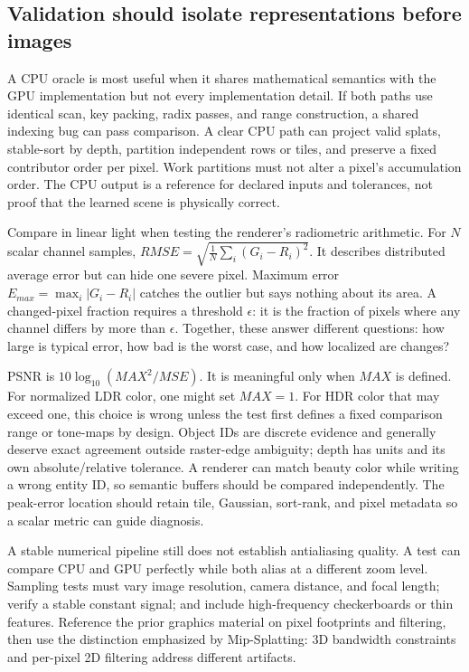 \subsection{Validation should isolate representations before images}\label{04-visual-computing-ii-ch037-validation-should-isolate-representations-before-images}

\hypertarget{04-visual-computing-ii-ch037-validation-should-isolate-representations-before-images}{}

A CPU oracle is most useful when it shares mathematical semantics with the GPU implementation but not every implementation detail. If both paths use identical scan, key packing, radix passes, and range construction, a shared indexing bug can pass comparison. A clear CPU path can project valid splats, stable-sort by depth, partition independent rows or tiles, and preserve a fixed contributor order per pixel. Work partitions must not alter a pixel's accumulation order. The CPU output is a reference for declared inputs and tolerances, not proof that the learned scene is physically correct.

Compare in linear light when testing the renderer's radiometric arithmetic. For \(N\) scalar channel samples, \(RMSE=\sqrt{\frac1N\sum_i(G_i-R_i)^2}\). It describes distributed average error but can hide one severe pixel. Maximum error \(E_{max}=\max_i|G_i-R_i|\) catches the outlier but says nothing about its area. A changed-pixel fraction requires a threshold \(\epsilon\): it is the fraction of pixels where any channel differs by more than \(\epsilon\). Together, these answer different questions: how large is typical error, how bad is the worst case, and how localized are changes?

PSNR is \(10\log_{10}(MAX^2/MSE)\). It is meaningful only when \(MAX\) is defined. For normalized LDR color, one might set \(MAX=1\). For HDR color that may exceed one, this choice is wrong unless the test first defines a fixed comparison range or tone-maps by design. Object IDs are discrete evidence and generally deserve exact agreement outside raster-edge ambiguity; depth has units and its own absolute/relative tolerance. A renderer can match beauty color while writing a wrong entity ID, so semantic buffers should be compared independently. The peak-error location should retain tile, Gaussian, sort-rank, and pixel metadata so a scalar metric can guide diagnosis.

A stable numerical pipeline still does not establish antialiasing quality. A test can compare CPU and GPU perfectly while both alias at a different zoom level. Sampling tests must vary image resolution, camera distance, and focal length; verify a stable constant signal; and include high-frequency checkerboards or thin features. Reference the prior graphics material on pixel footprints and filtering, then use the distinction emphasized by Mip-Splatting: 3D bandwidth constraints and per-pixel 2D filtering address different artifacts.

